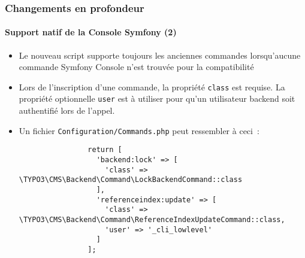 \begin{frame}[fragile]
	\frametitle{Changements en profondeur}
	\framesubtitle{Support natif de la Console Symfony (2)}

	\lstset{basicstyle=\tiny\ttfamily}

	\begin{itemize}

		\item Le nouveau script supporte toujours les anciennes commandes lorsqu'aucune
			commande Symfony Console n'est trouvée pour la compatibilité

		\item Lors de l'inscription d'une commande, la propriété \texttt{class} est requise.
			La propriété optionnelle \texttt{user} est à utiliser pour qu'un utilisateur
			backend soit authentifié lors de l'appel.

		\item Un fichier \texttt{Configuration/Commands.php} peut ressembler à ceci~:

			\begin{lstlisting}
				return [
				  'backend:lock' => [
				    'class' => \TYPO3\CMS\Backend\Command\LockBackendCommand::class
				  ],
				  'referenceindex:update' => [
				    'class' => \TYPO3\CMS\Backend\Command\ReferenceIndexUpdateCommand::class,
				    'user' => '_cli_lowlevel'
				  ]
				];
			\end{lstlisting}

	\end{itemize}

\end{frame}

